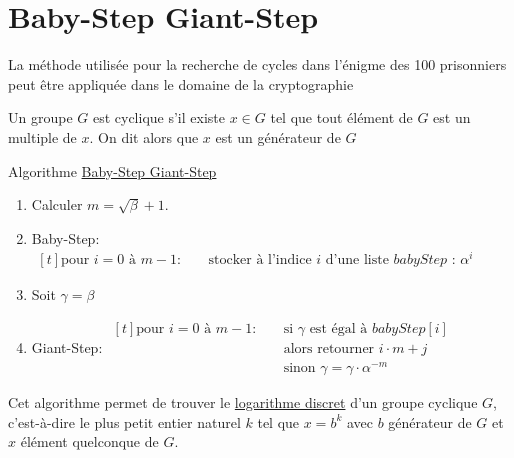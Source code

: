 \section{Baby-Step Giant-Step}

La méthode utilisée pour la recherche de cycles dans l'énigme des 100 prisonniers peut
être appliquée dans le domaine de la cryptographie

\begin{tcolorbox}
    Un groupe $G$ est cyclique s'il existe $x \in G$ 
    tel que tout élément de $G$ est un multiple de $x$.
    On dit alors que $x$ est un générateur de $G$ 
\end{tcolorbox}


\begin{algorithm}[H]
    \caption{Algorithme \href{https://fr.wikipedia.org/wiki/Baby-step_giant-step}{Baby-Step Giant-Step}}
        \begin{enumerate}
            \item Calculer $m = \sqrt{\beta} +1$.
            \item Baby-Step:
                $\begin{aligned}[t]
                    \text{pour } i = 0 \text{ à } m-1: \quad & \text{stocker à l'indice $i$ d'une liste $babyStep$ : } \alpha^i
                \end{aligned}$
            \item Soit $\gamma = \beta$
            \item Giant-Step:
                $\begin{aligned}[t]
                    \text{pour } i = 0 \text{ à } m-1: \quad & \text{si } \gamma \text{ est égal à } babyStep[i] \\
                                                                & \text{alors retourner } i \cdot m + j \\
                                                                & \text{sinon } \gamma = \gamma \cdot \alpha^{-m}
                \end{aligned}$
        \end{enumerate}
    \end{algorithm}

Cet algorithme permet de trouver le \href{https://fr.wikipedia.org/wiki/Logarithme_discret}{logarithme discret} d'un groupe cyclique $G$,
c'est-à-dire le plus petit entier naturel $k$ tel que $x = b^k$ avec $b$ générateur de $G$
et $x$ élément quelconque de $G$.

